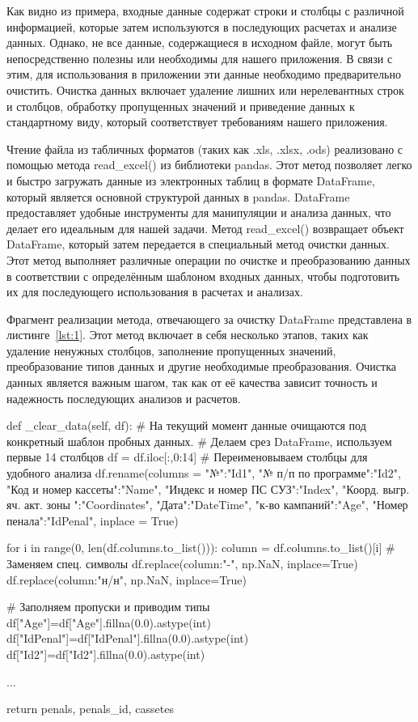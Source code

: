 Как видно из примера, входные данные содержат строки и столбцы с различной информацией, которые затем используются в последующих расчетах и анализе данных. Однако, не все данные, содержащиеся в исходном файле, могут быть непосредственно полезны или необходимы для нашего приложения. В связи с этим, для использования в приложении эти данные необходимо предварительно очистить. Очистка данных включает удаление лишних или нерелевантных строк и столбцов, обработку пропущенных значений и приведение данных к стандартному виду, который соответствует требованиям нашего приложения.

Чтение файла из табличных форматов (таких как .xls, .xlsx, .ods) реализовано с помощью метода read\_excel() из библиотеки pandas. Этот метод позволяет легко и быстро загружать данные из электронных таблиц в формате DataFrame, который является основной структурой данных в pandas. DataFrame предоставляет удобные инструменты для манипуляции и анализа данных, что делает его идеальным для нашей задачи. Метод read\_excel() возвращает объект DataFrame, который затем передается в специальный метод очистки данных. Этот метод выполняет различные операции по очистке и преобразованию данных в соответствии с определённым шаблоном входных данных, чтобы подготовить их для последующего использования в расчетах и анализах. 

Фрагмент реализации метода, отвечающего за очистку DataFrame представлена в листинге~\ref{lst:1}. Этот метод включает в себя несколько этапов, таких как удаление ненужных столбцов, заполнение пропущенных значений, преобразование типов данных и другие необходимые преобразования. Очистка данных является важным шагом, так как от её качества зависит точность и надежность последующих анализов и расчетов.

\begin{flushleft}
 \label{lst:1}
\begin{MyCodes}
def _clear_data(self, df):
	# На текущий момент данные очищаются под конкретный шаблон пробных данных.
	# Делаем срез DataFrame, используем первые 14 столбцов
	df = df.iloc[:,0:14] 
	# Переименовываем столбцы для удобного анализа
	df.rename(columns = {
		"№":"Id1",
		"№ п/п по программе":"Id2",
		"Код  и номер кассеты":"Name",
		"Индекс и номер ПС СУЗ":"Index",
		"Коорд. выгр. яч. акт. зоны ":"Coordinates",
		"Дата":"DateTime",
		"к-во кампаний":"Age",
		"Номер пенала":"IdPenal"}, inplace = True)
	
	for i in range(0, len(df.columns.to_list())):
		column = df.columns.to_list()[i]
		# Заменяем спец. символы
		df.replace({column:"-"}, np.NaN, inplace=True) 
		df.replace({column:"н/н"}, np.NaN, inplace=True)
	
	# Заполняем пропуски и приводим типы
	df["Age"]=df["Age"].fillna(0.0).astype(int)
	df["IdPenal"]=df["IdPenal"].fillna(0.0).astype(int)
	df["Id2"]=df["Id2"].fillna(0.0).astype(int)
	
	...
	
	return penals, penals_id, cassetes

\end{MyCodes}
\end{flushleft}

